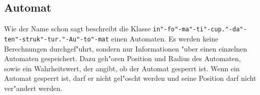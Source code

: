 \subsection{Automat}
Wie der Name schon sagt beschreibt die Klasse \texttt{in"-fo"-ma"-ti"-cup."-da"-ten"-struk"-tur."-Au"-to"-mat} einen Automaten. Es werden keine Berechnungen durchgef"uhrt, sondern nur Informationen "uber einen einzelnen Automaten gespeichert. Dazu geh"oren Position und Radius des Automaten, sowie ein Wahrheitswert, der angibt, ob der Automat gesperrt ist. Wenn ein Automat gesperrt ist, darf er nicht gel"oscht werden und seine Position darf nicht ver"andert werden.
